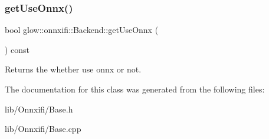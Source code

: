 \subsubsection{\texorpdfstring{get\+Use\+Onnx()}{getUseOnnx()}}
{\footnotesize\ttfamily bool glow\+::onnxifi\+::\+Backend\+::get\+Use\+Onnx (\begin{DoxyParamCaption}{ }\end{DoxyParamCaption}) const\hspace{0.3cm}{\ttfamily [inline]}}

\begin{DoxyReturn}{Returns}
the whether use onnx or not. 
\end{DoxyReturn}


The documentation for this class was generated from the following files\+:\begin{DoxyCompactItemize}
\item 
lib/\+Onnxifi/Base.\+h\item 
lib/\+Onnxifi/Base.\+cpp\end{DoxyCompactItemize}
